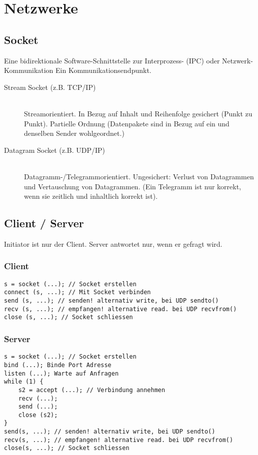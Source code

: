 \section{Netzwerke}

\subsection{Socket}
Eine bidirektionale Software-Schnittstelle zur Interprozess- (IPC) oder Netzwerk-Kommunikation Ein Kommunikationsendpunkt.

\begin{description}
\item[Stream Socket (z.B. TCP/IP)] \hfill \\
Streamorientiert. In Bezug auf Inhalt und Reihenfolge gesichert (Punkt zu Punkt). Partielle Ordnung (Datenpakete sind in Bezug auf ein und denselben Sender wohlgeordnet.)
\item[Datagram Socket (z.B. UDP/IP)] \hfill \\
Datagramm-/Telegrammorientiert. Ungesichert: Verlust von Datagrammen und Vertauschung von Datagrammen. (Ein Telegramm ist nur korrekt, wenn sie zeitlich und inhaltlich korrekt ist).
\end{description}


\subsection{Client / Server}
Initiator ist nur der Client. Server antwortet nur, wenn er gefragt wird.

\subsubsection{Client}
\begin{lstlisting}
s = socket (...); // Socket erstellen
connect (s, ...); // Mit Socket verbinden
send (s, ...); // senden! alternativ write, bei UDP sendto()
recv (s, ...); // empfangen! alternative read. bei UDP recvfrom()
close (s, ...); // Socket schliessen
\end{lstlisting}

\subsubsection{Server}
\begin{lstlisting}
s = socket (...); // Socket erstellen
bind (...); Binde Port Adresse
listen (...); Warte auf Anfragen
while (1) {
	s2 = accept (...); // Verbindung annehmen
	recv (...);
	send (...);
	close (s2);
}
send(s, ...); // senden! alternativ write, bei UDP sendto()
recv(s, ...); // empfangen! alternative read. bei UDP recvfrom()
close(s, ...); // Socket schliessen
\end{lstlisting}


